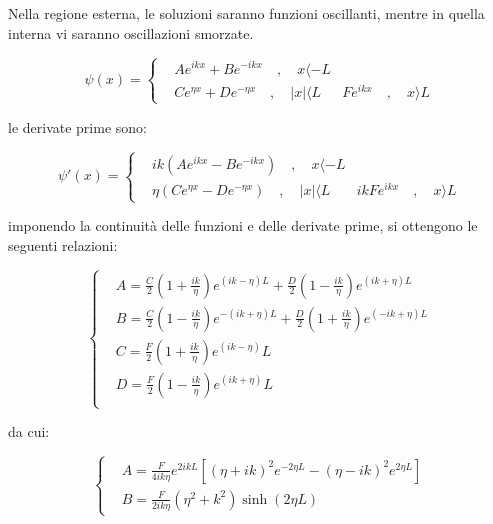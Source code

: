 \documentclass{report}
\begin{document}
Nella regione esterna, le soluzioni saranno funzioni oscillanti, mentre in quella interna vi saranno oscillazioni smorzate.

\begin{equation}
  \psi(x)=
  \left\{
  \begin{aligned}
     & Ae^{ikx}+Be^{-ikx} \quad , \quad x\langle -L        \\
     & Ce^{\eta x}+De^{-\eta x} \quad , \quad |x|\langle L
     & Fe^{ikx} \quad , \quad x\rangle L
  \end{aligned}
  \right.
\end{equation}

le derivate prime sono:

\begin{equation}
  \psi'(x)=
  \left\{
  \begin{aligned}
     & ik(Ae^{ikx}-Be^{-ikx}) \quad , \quad x\langle -L          \\
     & \eta(Ce^{\eta x}-De^{-\eta x}) \quad , \quad |x|\langle L
     & ikFe^{ikx} \quad , \quad x\rangle L
  \end{aligned}
  \right.
\end{equation}

imponendo la continuità delle funzioni e delle derivate prime, si ottengono le seguenti relazioni:

\begin{equation}
  \left\{
  \begin{aligned}
     & A= \frac{C}{2}\left(1+\frac{ik}{\eta}\right)e^{(ik-\eta)L}+ \frac{D}{2}\left(1-\frac{ik}{\eta}\right)e^{(ik+\eta)L}   \\
     & B= \frac{C}{2}\left(1-\frac{ik}{\eta}\right)e^{-(ik+\eta)L}+ \frac{D}{2}\left(1+\frac{ik}{\eta}\right)e^{(-ik+\eta)L} \\
     & C=\frac{F}{2}\left(1+\frac{ik}{\eta}\right)e^(ik-\eta)L                                                               \\
     & D=\frac{F}{2}\left(1-\frac{ik}{\eta}\right)e^(ik+\eta)L                                                               \\
  \end{aligned}
  \right.
\end{equation}

da cui:

\begin{equation}
  \left\{
  \begin{aligned}
     & A=\frac{F}{4ik\eta}e^{2ikL}\left[(\eta+ik)^2e^{-2\eta L}- (\eta-ik)^2e^{2\eta L}\right] \\
     & B= \frac{F}{2ik\eta}(\eta^2+k^2)\sinh(2\eta L)
  \end{aligned}
  \right.
\end{equation}
\end{document}

